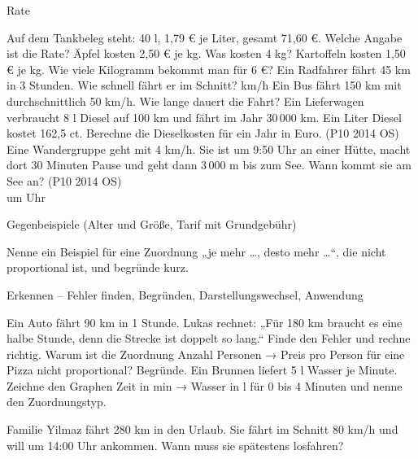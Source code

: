 \begin{aufgabe}{Rate}
\begin{teile}
\teil Auf dem Tankbeleg steht: 40 l, 1,79 € je Liter, gesamt 71,60 €. Welche Angabe ist die Rate?
\teil Äpfel kosten 2,50 € je kg. Was kosten 4 kg? \leerfeld[€]
\teil Kartoffeln kosten 1,50 € je kg. Wie viele Kilogramm bekommt man für 6 €? \leerfeld[kg]
\teil Ein Radfahrer fährt 45 km in 3 Stunden. Wie schnell fährt er im Schnitt? \leerfeld km/h
\teil Ein Bus fährt 150 km mit durchschnittlich 50 km/h. Wie lange dauert die Fahrt? \leerfeld[h]
\teil Ein Lieferwagen verbraucht 8 l Diesel auf 100 km und fährt im Jahr 30\,000 km. Ein Liter Diesel kostet 162,5 ct. Berechne die Dieselkosten für ein Jahr in Euro. \hfill (P10 2014 OS) \\ \leerfeld[€]
\teil Eine Wandergruppe geht mit 4 km/h. Sie ist um 9:50 Uhr an einer Hütte, macht dort 30 Minuten Pause und geht dann 3\,000 m bis zum See. Wann kommt sie am See an? \hfill (P10 2014 OS) \\ um \leerfeld Uhr
\end{teile}
\end{aufgabe}

\begin{aufgabe}{Gegenbeispiele (Alter und Größe, Tarif mit Grundgebühr)}
\begin{teile}
\teil Nenne ein Beispiel für eine Zuordnung „je mehr …, desto mehr …“, die nicht proportional ist, und begründe kurz.
\end{teile}
\end{aufgabe}

\begin{aufgabe}{Erkennen – Fehler finden, Begründen, Darstellungswechsel, Anwendung}
\begin{teile}
\teil Ein Auto fährt 90 km in 1 Stunde. Lukas rechnet: „Für 180 km braucht es eine halbe Stunde, denn die Strecke ist doppelt so lang.“ Finde den Fehler und rechne richtig.
\teil Warum ist die Zuordnung Anzahl Personen → Preis pro Person für eine Pizza nicht proportional? Begründe.
\teil Ein Brunnen liefert 5 l Wasser je Minute. Zeichne den Graphen Zeit in min → Wasser in l für 0 bis 4 Minuten und nenne den Zuordnungstyp.

\begin{ksys}[xmin=0,xmax=5,ymin=0,ymax=20,xlabel=Zeit in min,ylabel=Wasser in l]\end{ksys}
\teil Familie Yilmaz fährt 280 km in den Urlaub. Sie fährt im Schnitt 80 km/h und will um 14:00 Uhr ankommen. Wann muss sie spätestens losfahren?
\end{teile}
\end{aufgabe}
